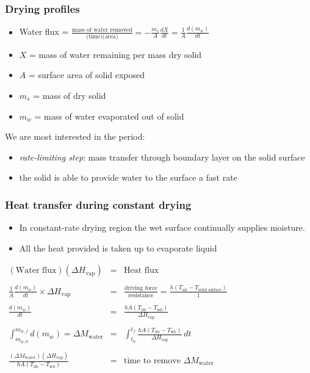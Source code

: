\begin{frame}\frametitle{Drying profiles}	
	\begin{itemize}
		\item	Water flux = $\displaystyle \frac{\text{mass of water removed}}{\text{(time)(area)}} = - \displaystyle \frac{m_s}{A} \frac{dX}{dt} = \frac{1}{A} \frac{d(m_w)}{dt}$
		\item	$X$ = mass of water remaining per mass dry solid
		\item	$A$ = surface area of solid exposed
		\item	$m_s$ = mass of dry solid
		\item	$m_w$ = mass of water evaporated out of solid
	\end{itemize}
	\vspace{12pt}
	We are most interested in the {\color{purple}{constant drying-rate}} period:
	\begin{itemize}
		\item	\emph{rate-limiting step}: mass transfer through boundary layer on the solid surface
		\item	the solid is able to provide water to the surface a fast rate
	\end{itemize}
\end{frame}

\begin{frame}\frametitle{Heat transfer during constant drying}
	\begin{itemize}
		\item	In constant-rate drying region the wet surface continually supplies moisture.
		\item	All the heat provided is taken up to evaporate liquid
	\end{itemize}
	\vspace{12pt}
	$\begin{array}{rcl}
		(\text{Water flux})(\Delta H_\text{vap})  							&=& \text{Heat flux}\\ 
		\\
		\displaystyle\frac{1}{A} \frac{d(m_w)}{dt} \times \Delta H_\text{vap} 	&=& \displaystyle\frac{\text{driving force}}{\text{resistance}} = \displaystyle\frac{h(T_\text{air} - T_\text{solid surface}) }{1} \\
		\\
		\displaystyle \frac{d(m_w)}{dt}   										&=& \displaystyle\frac{hA(T_\text{db} - T_\text{wb})}{\Delta H_\text{vap}}  \\
		\\
		\displaystyle \int_{m_{w,0}}^{m_{w,f}}{d(m_w)} = \Delta M_\text{water}	&=& \displaystyle \int_{t_0}^{t_f}{\frac{hA(T_\text{db} - T_\text{wb})}{\Delta H_\text{vap}}\, dt} \\
		\\
		\displaystyle  \frac{(\Delta M_\text{water}) (\Delta H_\text{vap})}{hA(T_\text{db} - T_\text{wb})} &=& \text{time to remove $\Delta M_\text{water}$}
	\end{array}
	$
	
\end{frame}

